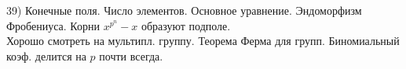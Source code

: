 39) Конечные поля. Число элементов. Основное уравнение. Эндоморфизм Фробениуса. Корни $x^{p^n} - x$ образуют подполе.\\
Хорошо смотреть на мультипл. группу. Теорема Ферма для групп. Биномиальный коэф. делится на $p$ почти всегда.\\
